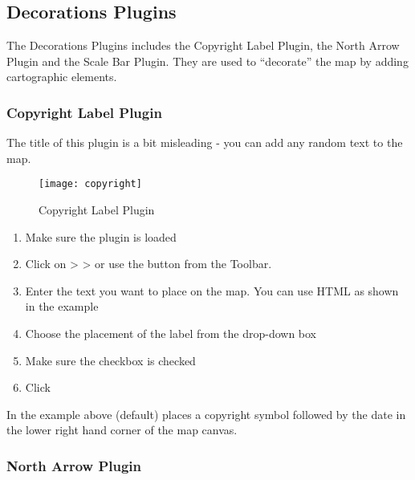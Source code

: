 
\subsection{Decorations Plugins}


The Decorations Plugins includes the Copyright Label Plugin, the North 
Arrow Plugin and the Scale Bar Plugin. They are used to ``decorate'' the 
map by adding cartographic elements. 

\subsubsection{Copyright Label Plugin}

The title of this plugin is a bit misleading - you can add any random text to the map.

\begin{figure}[ht]
   \begin{center}
   \caption{Copyright Label Plugin \nixcaption}\label{fig:copyright}\smallskip
   \texttt{[image: copyright]}
\end{center}  
\end{figure}

\begin{enumerate}
\item Make sure the plugin is loaded
\item Click on  >  >  or use the  button from the Toolbar.
\item Enter the text you want to place on the map. You can use HTML as
  shown in the example
\item Choose the placement of the label from the  drop-down box
\item Make sure the  checkbox is checked
\item Click  
\end{enumerate}

In the example above (default) places a copyright symbol followed by the date in the 
lower right hand corner of the map canvas.

\subsubsection{North Arrow Plugin}

